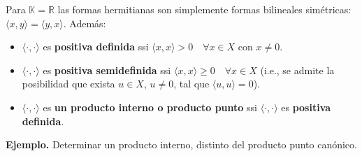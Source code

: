 \smallskip\noindent
Para $\mathbb{K}=\mathbb{R}$ las formas hermitianas son simplemente
formas bilineales sim\'etricas: 
$\langle x,y \rangle= \langle y,x \rangle$.
Adem\'as:
\begin{itemize}
\item
$\langle\cdot,\cdot\rangle$ es \textbf{positiva definida} ssi
$\langle x,x\rangle > 0\quad\forall x\in X$ con $x\neq0$.
\item
$\langle\cdot,\cdot\rangle$ es \textbf{positiva semidefinida} ssi
$\langle x,x\rangle\geq0\quad\forall x\in X$
(i.e., se admite la posibilidad que exista $u\in X$, $u\neq0$,
tal que $\langle u,u\rangle=0$).
\item
$\langle\cdot,\cdot \rangle$  es 
\textbf{un producto interno o producto punto} ssi 
$\langle\cdot,\cdot\rangle$ es \textbf{positiva definida}.
\end{itemize}

\medskip\noindent
\textbf{Ejemplo.}
Determinar un producto interno, distinto del producto punto can\'onico.

